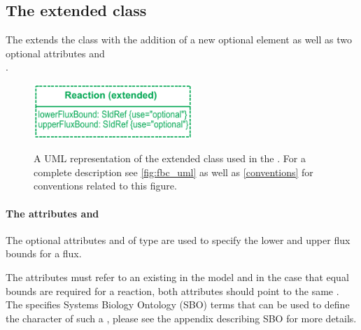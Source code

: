 
\subsection{The extended  class}
\label{reaction-class-ga}

The \FBCPackage extends the \sbmlthreecore \Reaction class with the addition of
a new optional element \GeneProductAssociation as well as two optional attributes
 and \\
.

\begin{figure}[h]
  \centering
  \includegraphics[width=6cm]{images/v2harmony_fbc_reaction.pdf}\\
  \caption{A UML representation of the extended \SBML \Reaction class used in
  the \FBCPackage. For a complete description see \ref{fig:fbc_uml} as well as \ref{conventions} for conventions related to this figure.}
  \label{fig:fbc_uml_reaction}
\end{figure}

\paragraph{The attributes  and }
The optional attributes  and  of type  are used to specify the lower and upper flux bounds for a \Reaction flux.

The attributes must refer to an existing \Parameter in the model and in the case that equal bounds are required for a reaction, both attributes should point to the same \Parameter. The \FBCPackage specifies Systems Biology Ontology (SBO) terms that can be used to define the character of such a \Parameter, please see the appendix describing SBO for more details.

